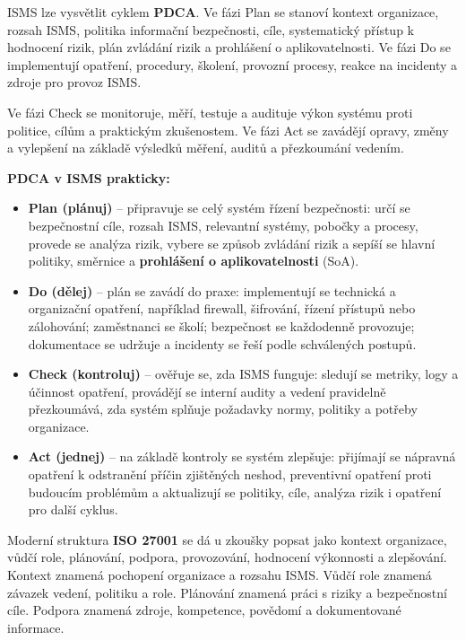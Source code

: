 \documentclass[11pt,a4paper]{article}
\begin{document}
ISMS lze vysvětlit cyklem \textbf{PDCA}. Ve fázi Plan se stanoví kontext organizace, rozsah ISMS, politika informační bezpečnosti, cíle, systematický přístup k hodnocení rizik, plán zvládání rizik a prohlášení o aplikovatelnosti. Ve fázi Do se implementují opatření, procedury, školení, provozní procesy, reakce na incidenty a zdroje pro provoz ISMS.

Ve fázi Check se monitoruje, měří, testuje a audituje výkon systému proti politice, cílům a praktickým zkušenostem. Ve fázi Act se zavádějí opravy, změny a vylepšení na základě výsledků měření, auditů a přezkoumání vedením.

\begin{notebox}
\textbf{PDCA v ISMS prakticky:}
\begin{itemize}
  \item \textbf{Plan (plánuj)} -- připravuje se celý systém řízení bezpečnosti: určí se bezpečnostní cíle, rozsah ISMS, relevantní systémy, pobočky a procesy, provede se analýza rizik, vybere se způsob zvládání rizik a sepíší se hlavní politiky, směrnice a \textbf{prohlášení o aplikovatelnosti} (SoA).
  \item \textbf{Do (dělej)} -- plán se zavádí do praxe: implementují se technická a organizační opatření, například firewall, šifrování, řízení přístupů nebo zálohování; zaměstnanci se školí; bezpečnost se každodenně provozuje; dokumentace se udržuje a incidenty se řeší podle schválených postupů.
  \item \textbf{Check (kontroluj)} -- ověřuje se, zda ISMS funguje: sledují se metriky, logy a účinnost opatření, provádějí se interní audity a vedení pravidelně přezkoumává, zda systém splňuje požadavky normy, politiky a potřeby organizace.
  \item \textbf{Act (jednej)} -- na základě kontroly se systém zlepšuje: přijímají se nápravná opatření k odstranění příčin zjištěných neshod, preventivní opatření proti budoucím problémům a aktualizují se politiky, cíle, analýza rizik i opatření pro další cyklus.
\end{itemize}
\end{notebox}

Moderní struktura \textbf{ISO 27001} se dá u zkoušky popsat jako kontext organizace, vůdčí role, plánování, podpora, provozování, hodnocení výkonnosti a zlepšování. Kontext znamená pochopení organizace a rozsahu ISMS. Vůdčí role znamená závazek vedení, politiku a role. Plánování znamená práci s riziky a bezpečnostní cíle. Podpora znamená zdroje, kompetence, povědomí a dokumentované informace.
\end{document}
